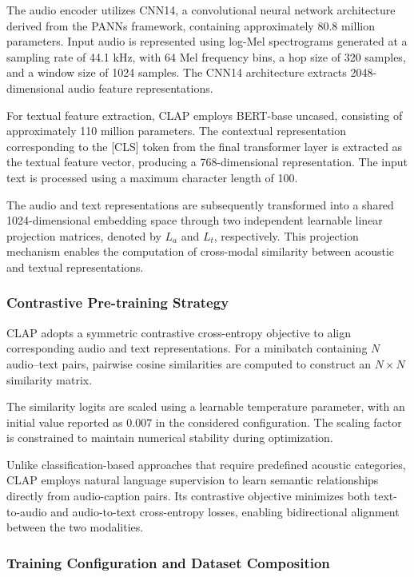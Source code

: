\documentclass[pdflatex,sn-mathphys-num]{sn-jnl}%
\theoremstyle{thmstyleone}%
\theoremstyle{thmstyletwo}%
\theoremstyle{thmstylethree}%
\begin{document}
The audio encoder utilizes CNN14, a convolutional neural network architecture derived from the PANNs framework, containing approximately 80.8 million parameters. Input audio is represented using log-Mel spectrograms generated at a sampling rate of 44.1 kHz, with 64 Mel frequency bins, a hop size of 320 samples, and a window size of 1024 samples. The CNN14 architecture extracts 2048-dimensional audio feature representations.

For textual feature extraction, CLAP employs BERT-base uncased, consisting of approximately 110 million parameters. The contextual representation corresponding to the [CLS] token from the final transformer layer is extracted as the textual feature vector, producing a 768-dimensional representation. The input text is processed using a maximum character length of 100.

The audio and text representations are subsequently transformed into a shared 1024-dimensional embedding space through two independent learnable linear projection matrices, denoted by $L_a$ and $L_t$, respectively. This projection mechanism enables the computation of cross-modal similarity between acoustic and textual representations.

\subsubsection{Contrastive Pre-training Strategy}

CLAP adopts a symmetric contrastive cross-entropy objective to align corresponding audio and text representations. For a minibatch containing $N$ audio--text pairs, pairwise cosine similarities are computed to construct an $N \times N$ similarity matrix.

The similarity logits are scaled using a learnable temperature parameter, with an initial value reported as $0.007$ in the considered configuration. The scaling factor is constrained to maintain numerical stability during optimization.

Unlike classification-based approaches that require predefined acoustic categories, CLAP employs natural language supervision to learn semantic relationships directly from audio-caption pairs. Its contrastive objective minimizes both text-to-audio and audio-to-text cross-entropy losses, enabling bidirectional alignment between the two modalities.

\subsubsection{Training Configuration and Dataset Composition}
\end{document}
